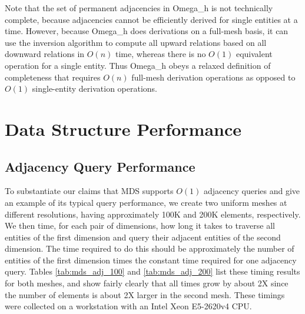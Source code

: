 Note that the set of permanent adjacencies in Omega\_h is not technically
complete, because adjacencies cannot be efficiently derived for
single entities at a time.
However, because Omega\_h does derivations on a full-mesh basis,
it can use the inversion algorithm to compute
all upward relations based on all downward relations in $O(n)$
time, whereas there is no $O(1)$ equivalent operation for a
single entity.
Thus Omega\_h obeys a relaxed definition of completeness that
requires $O(n)$ full-mesh derivation operations as opposed
to $O(1)$ single-entity derivation operations.

\section{Data Structure Performance}

\subsection{Adjacency Query Performance}
\label{sec:adj_perf}

To substantiate our claims that MDS supports $O(1)$ adjacency queries and
give an example of its typical query performance, we create two
uniform meshes at different resolutions, having approximately
100K and 200K elements, respectively.
We then time, for each pair of dimensions, how long it takes
to traverse all entities of the first dimension and query their
adjacent entities of the second dimension.
The time required to do this should be approximately the number
of entities of the first dimension times the constant time
required for one adjacency query.
Tables \ref{tab:mds_adj_100} and \ref{tab:mds_adj_200} list these timing
results for both meshes, and show fairly clearly that all times
grow by about 2X since the number of elements is about 2X larger
in the second mesh.
These timings were collected on a workstation with an Intel Xeon E5-2620v4 CPU.

